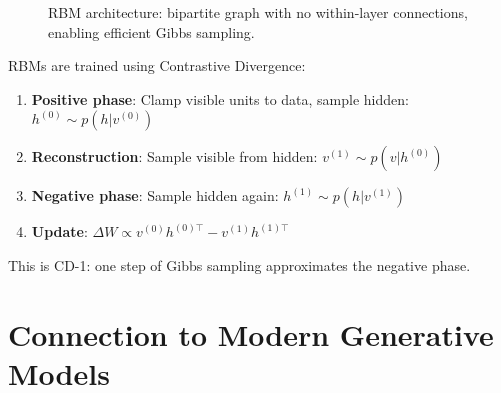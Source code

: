 \begin{figure}[h]
\centering
\caption{RBM architecture: bipartite graph with no within-layer connections, enabling efficient Gibbs sampling.}
\end{figure}

\begin{remark}
    RBMs are trained using Contrastive Divergence:
    \begin{enumerate}
        \item \textbf{Positive phase}: Clamp visible units to data, sample hidden: $h^{(0)} \sim p(h | v^{(0)})$
        \item \textbf{Reconstruction}: Sample visible from hidden: $v^{(1)} \sim p(v | h^{(0)})$
        \item \textbf{Negative phase}: Sample hidden again: $h^{(1)} \sim p(h | v^{(1)})$
        \item \textbf{Update}: $\Delta W \propto v^{(0)} h^{(0)\top} - v^{(1)} h^{(1)\top}$
    \end{enumerate}
    This is CD-1: one step of Gibbs sampling approximates the negative phase.
\end{remark}

\section{Connection to Modern Generative Models}

